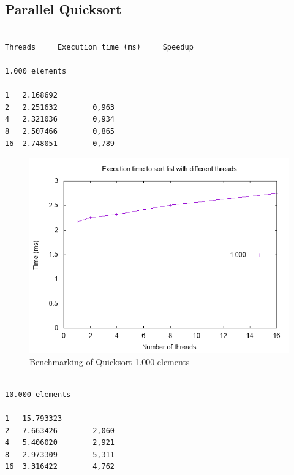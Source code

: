 \documentclass{article}
\begin{document}
\subsection{Parallel Quicksort}

\begin{verbatim}

Threads     Execution time (ms)     Speedup

1.000 elements

1   2.168692			
2   2.251632        0,963
4   2.321036        0,934		
8   2.507466        0,865 
16  2.748051        0,789
\end{verbatim}

\begin{figure}[h]
\centering
\includegraphics[scale=0.5]{Quicksort - 1k.png}
\caption{Benchmarking of Quicksort 1.000 elements}
\end{figure}      
\clearpage

\begin{verbatim}
    
10.000 elements

1   15.793323 
2   7.663426        2,060 
4   5.406020        2,921	 
8   2.973309        5,311 
16  3.316422        4,762

\end{verbatim}
\end{document}
